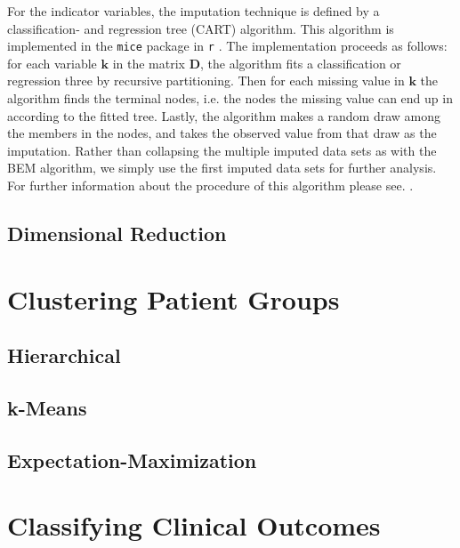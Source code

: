\documentclass[../thesis.tex]{subfiles}
\begin{document}


\indent For the indicator variables, the imputation technique is defined by a classification- and regression tree (CART) algorithm. This algorithm is implemented in the \texttt{mice} package in \texttt{r} \citep{buuren2010mice}. The implementation proceeds as follows: for each variable $\boldsymbol{k}$ in the matrix $\boldsymbol{D}$, the algorithm fits a classification or regression three by recursive partitioning. Then for each missing value in $\boldsymbol{k}$ the algorithm finds the terminal nodes, i.e. the nodes the missing value can end up in according to the fitted tree. Lastly, the algorithm makes a random draw among the members in the nodes, and takes the observed value from that draw as the imputation. Rather than collapsing the multiple imputed data sets as with the BEM algorithm, we simply use the first imputed data sets for further analysis. For further information about the procedure of this algorithm please see. \cite{burgette2010multiple}.\\
\indent 



\newpage


\subsection{Dimensional Reduction}
\label{subsec:dim_red}

\section{Clustering Patient Groups}
\label{sec:cluster_pat_gro}

\subsection{Hierarchical}
\label{subsec:hierarchical}

\subsection{k-Means}
\label{subsec:k-means}

\subsection{Expectation-Maximization}
\label{subsec:em}

\section{Classifying Clinical Outcomes}
\label{sec:classify_clin_out}
\end{document}

